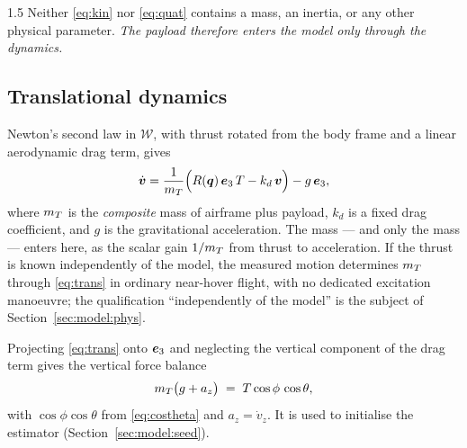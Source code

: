 \begin{spacing}{1.5}
Neither \eqref{eq:kin} nor \eqref{eq:quat} contains a mass, an inertia, or any
other physical parameter. \emph{The payload therefore enters the model only
through the dynamics.}

\subsection{Translational dynamics}\label{sec:model:trans}

Newton's second law in $\mathcal{W}$, with thrust rotated from the body frame and
a linear aerodynamic drag term, gives
\begin{equation}
\dot{\bm{v}} = \frac{1}{m_T}\Bigl( R(\bm{q})\, \bm{e}_3\, T - k_d\, \bm{v} \Bigr) - g\, \bm{e}_3,
\label{eq:trans}
\end{equation}
where $m_T$ is the \emph{composite} mass of airframe plus payload, $k_d$ is a
fixed drag coefficient, and $g$ is the gravitational acceleration. The mass ---
and only the mass --- enters here, as the scalar gain $1/m_T$ from thrust to
acceleration. If the thrust is known independently of the model, the measured
motion determines $m_T$ through \eqref{eq:trans} in ordinary near-hover flight,
with no dedicated excitation manoeuvre; the qualification ``independently of the
model'' is the subject of Section~\ref{sec:model:phys}.

Projecting \eqref{eq:trans} onto $\bm{e}_3$ and neglecting the vertical component of
the drag term gives the vertical force balance
\begin{equation}
m_T\bigl(g + a_z\bigr) \;=\; T\cos\phi\,\cos\theta ,
\label{eq:vbal}
\end{equation}
with $\cos\phi\cos\theta$ from \eqref{eq:costheta} and $a_z=\dot v_z$. It is
used to initialise the estimator (Section~\ref{sec:model:seed}).


\end{spacing}
